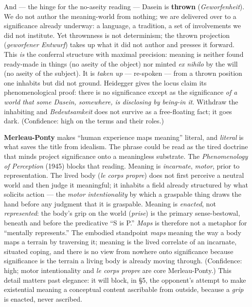 \documentclass[11pt]{article}
\begin{document}
And — the hinge for the no-aseity reading — Dasein is \textbf{thrown} (\emph{Geworfenheit}). We do not author the meaning-world from nothing; we are delivered over to a significance already underway: a language, a tradition, a set of involvements we did not institute. Yet thrownness is not determinism; the thrown projection (\emph{geworfener Entwurf}) takes up what it did not author and presses it forward. This \emph{is} the conferral structure with maximal precision: meaning is neither found ready-made in things (no aseity of the object) nor minted \emph{ex nihilo} by the will (no aseity of the subject). It is \emph{taken up} — re-spoken — from a thrown position one inhabits but did not ground. Heidegger gives the locus claim its phenomenological proof: there is no significance except as the significance \emph{of a world that some Dasein, somewhere, is disclosing by being-in it}. Withdraw the inhabiting and \emph{Bedeutsamkeit} does not survive as a free-floating fact; it goes dark. (Confidence: high on the terms and their roles.)

\textbf{Merleau-Ponty} makes ``human experience maps meaning'' literal, and \emph{literal} is what saves the title from idealism. The phrase could be read as the tired doctrine that minds project significance onto a meaningless substrate. The \emph{Phenomenology of Perception} (1945) blocks that reading. Meaning is \emph{incarnate}, \emph{motor}, prior to representation. The lived body (\emph{le corps propre}) does not first perceive a neutral world and then judge it meaningful; it inhabits a field already structured by what solicits action — the \emph{motor intentionality} by which a graspable thing draws the hand before any judgment that it is graspable. Meaning is \emph{enacted}, not \emph{represented}: the body's grip on the world (\emph{prise}) is the primary sense-bestowal, beneath and before the predicative ``S is P.'' \emph{Maps} is therefore not a metaphor for ``mentally represents.'' The embodied standpoint \emph{maps} meaning the way a body maps a terrain by traversing it; meaning is the lived correlate of an incarnate, situated coping, and there is no view from nowhere onto significance because significance is the terrain a living body is already moving through. (Confidence: high; motor intentionality and \emph{le corps propre} are core Merleau-Ponty.) This detail matters past elegance: it will block, in §5, the opponent's attempt to make existential meaning a conceptual content ascribable from outside, because a \emph{grip} is enacted, never ascribed.
\end{document}
